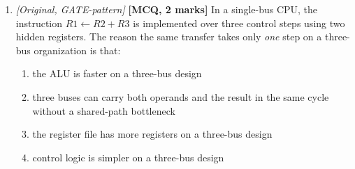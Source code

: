 \documentclass[11pt]{article}
\begin{document}
\begin{enumerate}
\item[\textbf{Q7}] \textit{[Original, GATE-pattern]} \textbf{[MCQ, 2 marks]} In a single-bus CPU, the instruction $R1 \gets R2 + R3$ is implemented over three control steps using two hidden registers. The reason the same transfer takes only \emph{one} step on a three-bus organization is that:
\begin{enumerate}
  \item[(A)] the ALU is faster on a three-bus design
  \item[(B)] three buses can carry both operands and the result in the same cycle without a shared-path bottleneck
  \item[(C)] the register file has more registers on a three-bus design
  \item[(D)] control logic is simpler on a three-bus design
\end{enumerate}

\end{enumerate}
\end{document}
